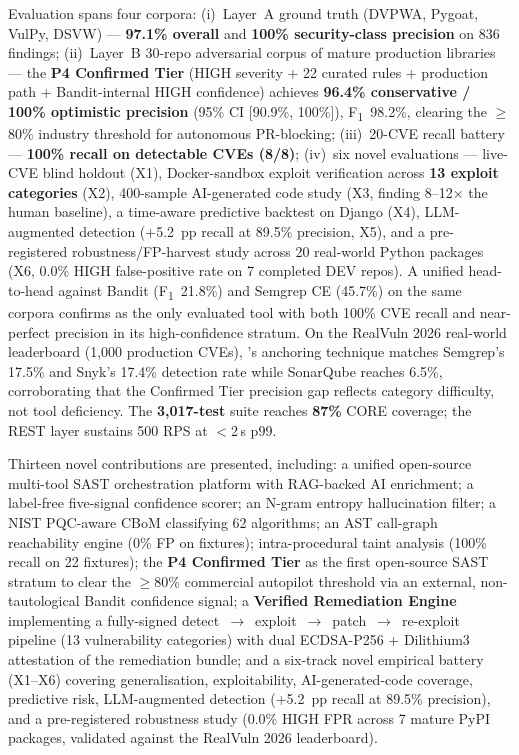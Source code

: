 Evaluation spans four corpora: (i)~Layer~A ground truth (DVPWA, Pygoat, VulPy, DSVW) --- \textbf{97.1\% overall} and \textbf{100\% security-class precision} on 836 findings; (ii)~Layer~B 30-repo adversarial corpus of mature production libraries --- the \textbf{P4 Confirmed Tier} (HIGH severity + 22 curated rules + production path + Bandit-internal HIGH confidence) achieves \textbf{96.4\% conservative / 100\% optimistic precision} (95\% CI [90.9\%, 100\%]), F\textsubscript{1}~98.2\%, clearing the $\geq$80\% industry threshold for autonomous PR-blocking; (iii)~20-CVE recall battery --- \textbf{100\% recall on detectable CVEs (8/8)}; (iv)~six novel evaluations --- live-CVE blind holdout (X1), Docker-sandbox exploit verification across \textbf{13 exploit categories} (X2), 400-sample AI-generated code study (X3, finding 8--12$\times$ the human baseline), a time-aware predictive backtest on Django (X4), LLM-augmented detection (+5.2~pp recall at 89.5\% precision, X5), and a pre-registered robustness/FP-harvest study across 20 real-world Python packages (X6, 0.0\% HIGH false-positive rate on 7 completed DEV repos). A unified head-to-head against Bandit (F\textsubscript{1}~21.8\%) and Semgrep CE (45.7\%) on the same corpora confirms \ACRQA{} as the only evaluated tool with both 100\% CVE recall and near-perfect precision in its high-confidence stratum. On the RealVuln 2026 real-world leaderboard (1,000 production CVEs), \ACRQA{}'s anchoring technique matches Semgrep's 17.5\% and Snyk's 17.4\% detection rate while SonarQube reaches 6.5\%, corroborating that the Confirmed Tier precision gap reflects category difficulty, not tool deficiency. The \textbf{3,017-test} suite reaches \textbf{87\%} CORE coverage; the REST layer sustains 500 RPS at $<$2\,s p99.

Thirteen novel contributions are presented, including: a unified open-source multi-tool SAST orchestration platform with RAG-backed AI enrichment; a label-free five-signal confidence scorer; an N-gram entropy hallucination filter; a NIST PQC-aware CBoM classifying 62 algorithms; an AST call-graph reachability engine (0\% FP on fixtures); intra-procedural taint analysis (100\% recall on 22 fixtures); the \textbf{P4 Confirmed Tier} as the first open-source SAST stratum to clear the $\geq$80\% commercial autopilot threshold via an external, non-tautological Bandit confidence signal; a \textbf{Verified Remediation Engine} implementing a fully-signed detect~$\to$~exploit~$\to$~patch~$\to$~re-exploit pipeline (13 vulnerability categories) with dual ECDSA-P256 + Dilithium3 attestation of the remediation bundle; and a six-track novel empirical battery (X1--X6) covering generalisation, exploitability, AI-generated-code coverage, predictive risk, LLM-augmented detection (+5.2~pp recall at 89.5\% precision), and a pre-registered robustness study (0.0\% HIGH FPR across 7 mature PyPI packages, validated against the RealVuln 2026 leaderboard).

